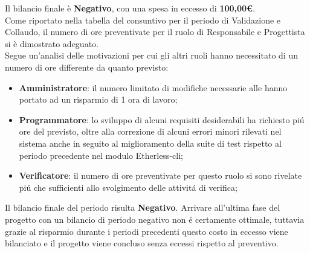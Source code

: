 	Il bilancio finale è \textbf{Negativo}, con una spesa in eccesso di \textbf{100,00\euro}. \\ Come riportato nella tabella del consuntivo per il periodo di Validazione e Collaudo, il numero di ore preventivate per il ruolo di Responsabile e Progettista si è dimostrato adeguato. \\ Segue un'analisi delle motivazioni per cui gli altri ruoli hanno necessitato di un numero di ore differente da quanto previsto:
	\begin{itemize}
		\item \textbf{Amministratore}: il numero limitato di modifiche necessarie alle \NdP{} hanno portato ad un risparmio di 1 ora di lavoro;
		\item \textbf{Programmatore}: lo sviluppo di alcuni requisiti desiderabili ha richiesto piú ore del previsto, oltre alla correzione di alcuni errori minori rilevati nel sistema anche in seguito al miglioramento della suite di test rispetto al periodo precedente nel modulo Etherless-cli;
		\item \textbf{Verificatore}: il numero di ore preventivate per questo ruolo si sono rivelate piú che sufficienti allo svolgimento delle attivitá di verifica;
	\end{itemize}

	Il bilancio finale del periodo risulta \textbf{Negativo}. Arrivare all'ultima fase del progetto con un bilancio di periodo negativo non é certamente ottimale, tuttavia grazie al risparmio durante i periodi precedenti questo costo in eccesso viene bilanciato e il progetto viene concluso senza eccessi rispetto al preventivo.
